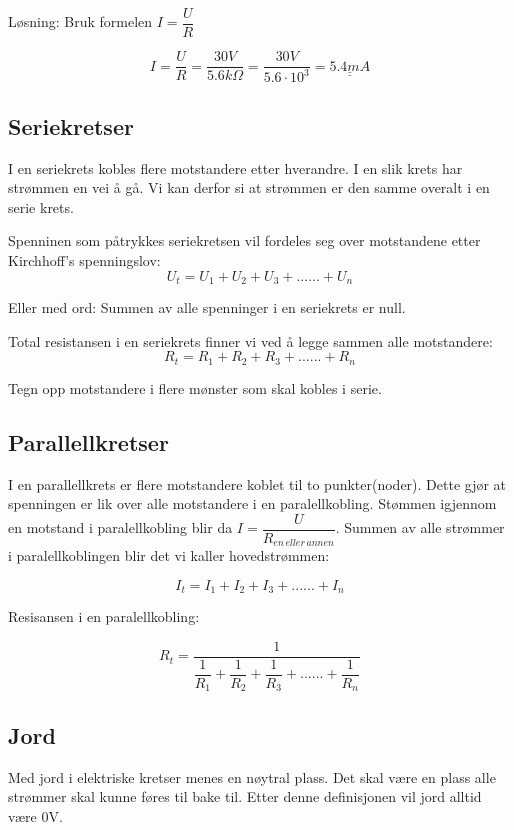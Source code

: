 \documentclass[12pt,a4paper]{article}
\begin{document}
\vskip 0.5cm
Løsning: Bruk formelen $I=\dfrac{U}{R}$

\[
I=\dfrac{U}{R}=\dfrac{30V}{5.6k\Omega}=\dfrac{30V}{5.6\cdot10^{3}}=\underline{\underline{5.4mA}}
\]




\subsection{Seriekretser}

I en seriekrets kobles flere motstandere etter hverandre. I en slik
krets har strømmen en vei å gå. Vi kan derfor si at strømmen er den
samme overalt i en serie krets. 

Spenninen som påtrykkes seriekretsen vil fordeles seg over motstandene
etter Kirchhoff's spenningslov:
\[
U_{t}=U_{1}+U_{2}+U_{3}+......+U_{n}
\]

Eller med ord: Summen av alle spenninger i en seriekrets er null.

Total resistansen i en seriekrets finner vi ved å legge sammen alle
motstandere:
\[
R_{t}=R_{1}+R_{2}+R_{3}+......+R_{n}
\]

Tegn opp motstandere i flere mønster som skal kobles i serie.

\subsection{Parallellkretser}

I en parallellkrets er flere motstandere koblet til to punkter(noder).
Dette gjør at spenningen er lik over alle motstandere i en paralellkobling.
Stømmen igjennom en motstand i paralellkobling blir da $I=\dfrac{U}{R_{en\,eller\,annen}}$.
Summen av alle strømmer i paralellkoblingen blir det vi kaller hovedstrømmen:

\[
I_{t}=I_{1}+I_{2}+I_{3}+......+I_{n}
\]

Resisansen i en paralellkobling:

\[
R_{t}=\dfrac{1}{\dfrac{1}{R_{1}}+\dfrac{1}{R_{2}}+\dfrac{1}{R_{3}}+......+\dfrac{1}{R_{n}}}
\]


\subsection{Jord}

Med jord i elektriske kretser menes en nøytral plass. Det skal være
en plass alle strømmer skal kunne føres til bake til. Etter denne
definisjonen vil jord alltid være 0V. 
\end{document}
